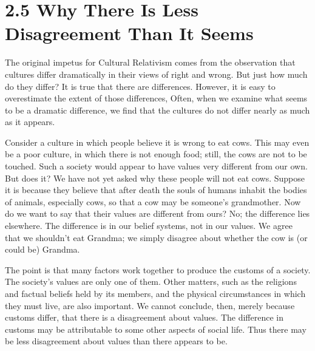\section{2.5 Why There Is Less Disagreement Than It Seems} 
The original impetus for Cultural Relativism comes from the observation 
that cultures differ dramatically in their views of right and wrong. But just 
how much do they differ? It is true that there are differences. However, it 
is easy to overestimate  the extent of those differences, Often, when we 
examine  what  seems  to  be  a  dramatic  difference,  we  find  that  the 
cultures do not differ nearly as much as it appears. 

Consider a culture in which people  believe it is wrong to eat cows. This 
may even be a poor culture, in which there is not enough food; still, the 
cows are not to be touched. Such a society would appear to have values 
very  different  from  our  own.  But  does  it?  We  have  not  yet  asked why 
these  people  will not  eat  cows. Suppose  it  is because  they believe  that 
after death the souls of humans inhabit the bodies of animals, especially 
cows, so  that  a  cow  may be  someone's  grandmother.  Now do  we want 
to  say  that  their  values  are  different  from  ours?  No;  the  difference  lies 
elsewhere. The difference is in our belief systems, not in our values. We 
agree that we shouldn't eat Grandma; we simply disagree about whether 
the cow is (or could be) Grandma. 

The point is that many factors work together to produce the customs of a 
society. The  society's values are  only one  of them. Other matters, such 
as the religions and factual beliefs held by its members, and the physical 
circumstances  in  which  they  must  live,  are  also  important.  We  cannot 
conclude, then, merely because customs differ, that there is a 
disagreement about values. The difference in customs may be 
attributable to some other aspects of social life. Thus there may be less 
disagreement about values than there appears to be. 

